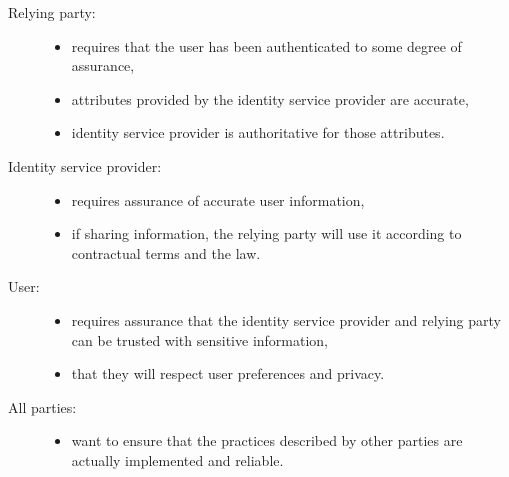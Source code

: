\documentclass{article}
\begin{document}
                                    
                                    \begin{description}
                                        \item[Relying party:] 
                                        \begin{itemize}
                                            \item requires that the user has been authenticated to some degree of assurance,
                                            \item attributes provided by the identity service provider are accurate,
                                            \item identity service provider is authoritative for those attributes.
                                        \end{itemize}
                                        
                                        \item[Identity service provider:] 
                                        \begin{itemize}
                                            \item requires assurance of accurate user information,
                                            \item if sharing information, the relying party will use it according to contractual terms and the law.
                                        \end{itemize}
                                        
                                        \item[User:] 
                                        \begin{itemize}
                                            \item requires assurance that the identity service provider and relying party can be trusted with sensitive information,
                                            \item that they will respect user preferences and privacy.
                                        \end{itemize}
                                        
                                        \item[All parties:] 
                                        \begin{itemize}
                                            \item want to ensure that the practices described by other parties are actually implemented and reliable.
                                        \end{itemize}
                                    \end{description}
\end{document}
